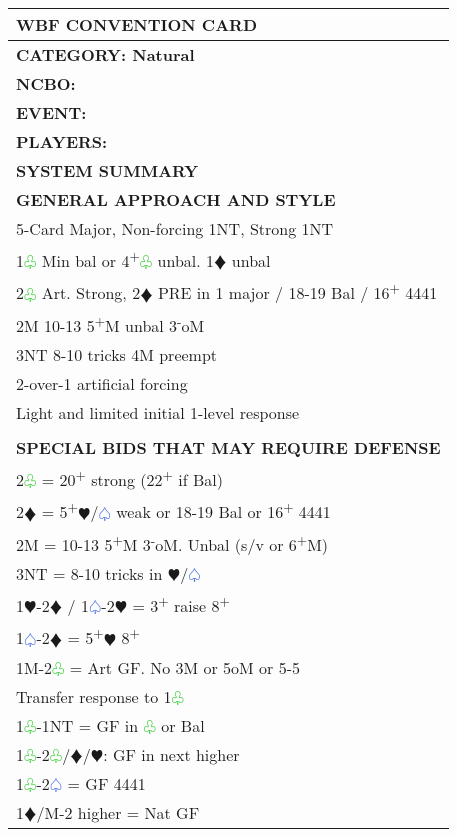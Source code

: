 \documentclass{article}
\renewcommand{\sp}{\textcolor{RoyalBlue}{$\varspade$}}
\newcommand{\he}{\textcolor{RubineRed}{$\varheart$}}
\newcommand{\di}{\textcolor{Peach}{$\vardiamond$}}
\newcommand{\cl}{\textcolor{LimeGreen}{$\varclub$}}
\newcommand{\nt}{\relsize{-1}NT\relsize{1}}
\newcommand{\up}{\textsuperscript{+}}
\newcommand{\down}{\textsuperscript{-}}
\begin{document}
\begin{minipage}{90mm}
	\begin{tabular}{| p{88mm} |}
		\hline
		\cellcolor[gray]{0.9} \textbf{WBF CONVENTION CARD} \\ \hline
		\textbf{CATEGORY: Natural} \\
		\textbf{NCBO:} \\
		\textbf{EVENT:} \\
		\textbf{PLAYERS:} \\
		\cellcolor[gray]{0.9} \textbf{SYSTEM SUMMARY} \\ \hline
		\cellcolor[gray]{0.9} \textbf{GENERAL APPROACH AND STYLE} \\ \hline
		5-Card Major, Non-forcing 1\nt{}, Strong 1\nt{}\\ \hline
		1\cl{} Min bal or 4\up{}\cl{} unbal. 1\di{} unbal \\ \hline
		2\cl{} Art. Strong, 2\di{} PRE in 1 major / 18-19 Bal / 16\up{} 4441 \\ \hline
		2M 10-13 5\up{}M unbal 3\down{}oM \\ \hline
		3\nt{} 8-10 tricks 4M preempt \\ \hline
		2-over-1 artificial forcing \\ \hline
		Light and limited initial 1-level response \\ \hline
		\\ \hline
		\cellcolor[gray]{0.9} \textbf{SPECIAL BIDS THAT MAY REQUIRE DEFENSE} \\ \hline
		2\cl{} = 20\up{} strong (22\up{} if Bal) \\ \hline
		2\di{} = 5\up{}\he{}/\sp{} weak or 18-19 Bal or 16\up{} 4441 \\ \hline
		2M = 10-13 5\up{}M 3\down{}oM. Unbal (s/v or 6\up{}M)\\ \hline
		3\nt{} = 8-10 tricks in \he{}/\sp{} \\ \hline
		1\he{}-2\di{} / 1\sp{}-2\he{} = 3\up{} raise 8\up{} \\ \hline
		1\sp{}-2\di{} = 5\up{}\he{} 8\up{} \\ \hline
		1M-2\cl{} = Art GF. No 3M or 5oM or 5-5 \\ \hline
		Transfer response to 1\cl{} \\ \hline
		1\cl{}-1\nt{} = GF in \cl{} or Bal \\ \hline
		1\cl{}-2\cl{}/\di{}/\he{}: GF in next higher \\ \hline
		1\cl{}-2\sp{} = GF 4441 \\ \hline
		1\di{}/M-2 higher = Nat GF \\ \hline

\end{tabular}
\end{minipage}
\end{document}
